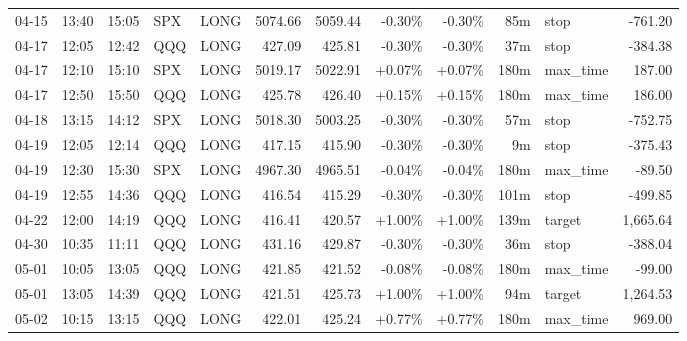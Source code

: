 \documentclass[11pt,a4paper,twoside]{article}
\begin{document}
\begin{center}
\begin{longtable}{>{\color{txtmain}}l l l l l r r r r r >{\color{txtmain}}l r}
04-15 & 13:40 & 15:05 & SPX & LONG & 5074.66 & 5059.44 & \textcolor{lossred}{-0.30\%} & \textcolor{lossred}{-0.30\%} & 85m & stop & \textcolor{lossred}{-761.20} \\
04-17 & 12:05 & 12:42 & QQQ & LONG & 427.09 & 425.81 & \textcolor{lossred}{-0.30\%} & \textcolor{lossred}{-0.30\%} & 37m & stop & \textcolor{lossred}{-384.38} \\
04-17 & 12:10 & 15:10 & SPX & LONG & 5019.17 & 5022.91 & \textcolor{wingreen}{+0.07\%} & \textcolor{wingreen}{+0.07\%} & 180m & max\_time & \textcolor{wingreen}{187.00} \\
04-17 & 12:50 & 15:50 & QQQ & LONG & 425.78 & 426.40 & \textcolor{wingreen}{+0.15\%} & \textcolor{wingreen}{+0.15\%} & 180m & max\_time & \textcolor{wingreen}{186.00} \\
04-18 & 13:15 & 14:12 & SPX & LONG & 5018.30 & 5003.25 & \textcolor{lossred}{-0.30\%} & \textcolor{lossred}{-0.30\%} & 57m & stop & \textcolor{lossred}{-752.75} \\
04-19 & 12:05 & 12:14 & QQQ & LONG & 417.15 & 415.90 & \textcolor{lossred}{-0.30\%} & \textcolor{lossred}{-0.30\%} & 9m & stop & \textcolor{lossred}{-375.43} \\
04-19 & 12:30 & 15:30 & SPX & LONG & 4967.30 & 4965.51 & \textcolor{lossred}{-0.04\%} & \textcolor{lossred}{-0.04\%} & 180m & max\_time & \textcolor{lossred}{-89.50} \\
04-19 & 12:55 & 14:36 & QQQ & LONG & 416.54 & 415.29 & \textcolor{lossred}{-0.30\%} & \textcolor{lossred}{-0.30\%} & 101m & stop & \textcolor{lossred}{-499.85} \\
04-22 & 12:00 & 14:19 & QQQ & LONG & 416.41 & 420.57 & \textcolor{wingreen}{+1.00\%} & \textcolor{wingreen}{+1.00\%} & 139m & target & \textcolor{wingreen}{1,665.64} \\
04-30 & 10:35 & 11:11 & QQQ & LONG & 431.16 & 429.87 & \textcolor{lossred}{-0.30\%} & \textcolor{lossred}{-0.30\%} & 36m & stop & \textcolor{lossred}{-388.04} \\
05-01 & 10:05 & 13:05 & QQQ & LONG & 421.85 & 421.52 & \textcolor{lossred}{-0.08\%} & \textcolor{lossred}{-0.08\%} & 180m & max\_time & \textcolor{lossred}{-99.00} \\
05-01 & 13:05 & 14:39 & QQQ & LONG & 421.51 & 425.73 & \textcolor{wingreen}{+1.00\%} & \textcolor{wingreen}{+1.00\%} & 94m & target & \textcolor{wingreen}{1,264.53} \\
05-02 & 10:15 & 13:15 & QQQ & LONG & 422.01 & 425.24 & \textcolor{wingreen}{+0.77\%} & \textcolor{wingreen}{+0.77\%} & 180m & max\_time & \textcolor{wingreen}{969.00} \\

\end{longtable}
\end{center}
\end{document}
